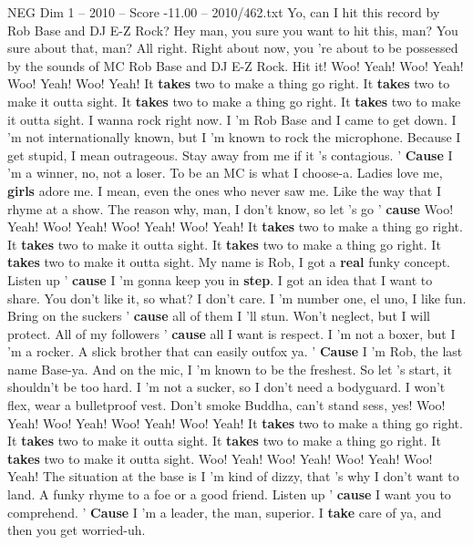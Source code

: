 \begin{textsample}{NEG Dim 1 – 2010 – Score -11.00 – 2010/462.txt}  \label{ex:f1_neg_022}
Yo, can I hit this record by Rob Base and DJ E-Z Rock?
Hey man, you sure you want to hit this, man?
You sure about that, man?
All right.
Right about now, you 're about to be possessed by the sounds of MC Rob Base and DJ E-Z Rock.
Hit it!
Woo!
Yeah!
Woo!
Yeah!
Woo!
Yeah!
Woo!
Yeah!
It \textbf{takes} two to make a thing go right.
It \textbf{takes} two to make it outta sight.
It \textbf{takes} two to make a thing go right.
It \textbf{takes} two to make it outta sight.
I wanna rock right now.
I 'm Rob Base and I came to get down.
I 'm not internationally known, but I 'm known to rock the microphone.
Because I get stupid, I mean outrageous.
Stay away from me if it 's contagious. ' \textbf{Cause} I 'm a winner, no, not a loser.
To be an MC is what I choose-a.
Ladies love me, \textbf{girls} adore me.
I mean, even the ones who never saw me.
Like the way that I rhyme at a show.
The reason why, man, I don't know, so let 's go ' \textbf{cause} Woo!
Yeah!
Woo!
Yeah!
Woo!
Yeah!
Woo!
Yeah!
It \textbf{takes} two to make a thing go right.
It \textbf{takes} two to make it outta sight.
It \textbf{takes} two to make a thing go right.
It \textbf{takes} two to make it outta sight.
My name is Rob, I got a \textbf{real} funky concept.
Listen up ' \textbf{cause} I 'm gonna keep you in \textbf{step}.
I got an idea that I want to share.
You don't like it, so what?
I don't care.
I 'm number one, el uno, I like fun.
Bring on the suckers ' \textbf{cause} all of them I 'll stun.
Won't neglect, but I will protect.
All of my followers ' \textbf{cause} all I want is respect.
I 'm not a boxer, but I 'm a rocker.
A slick brother that can easily outfox ya. ' \textbf{Cause} I 'm Rob, the last name Base-ya.
And on the mic, I 'm known to be the freshest.
So let 's start, it shouldn't be too hard.
I 'm not a sucker, so I don't need a bodyguard.
I won't flex, wear a bulletproof vest.
Don't smoke Buddha, can't stand sess, yes!
Woo!
Yeah!
Woo!
Yeah!
Woo!
Yeah!
Woo!
Yeah!
It \textbf{takes} two to make a thing go right.
It \textbf{takes} two to make it outta sight.
It \textbf{takes} two to make a thing go right.
It \textbf{takes} two to make it outta sight.
Woo!
Yeah!
Woo!
Yeah!
Woo!
Yeah!
Woo!
Yeah!
The situation at the base is I 'm kind of dizzy, that 's why I don't want to land.
A funky rhyme to a foe or a good friend.
Listen up ' \textbf{cause} I want you to comprehend. ' \textbf{Cause} I 'm a leader, the man, superior.
I \textbf{take} care of ya, and then you get worried-uh.

\end{textsample}
